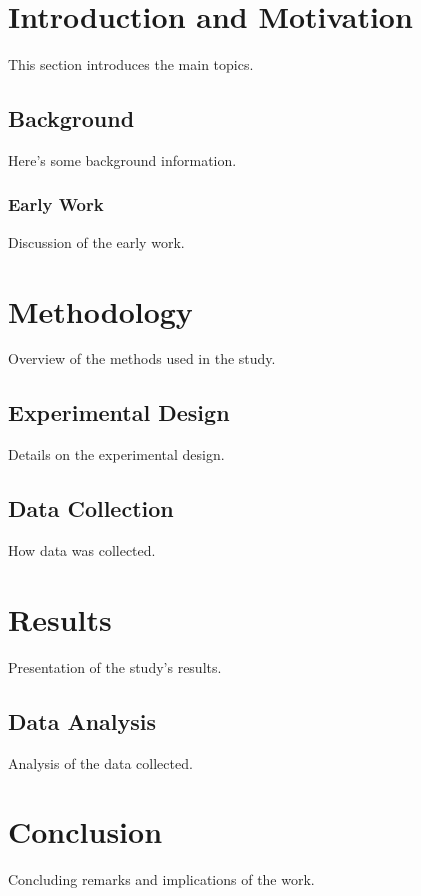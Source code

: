 \documentclass{article}
\begin{document}
\tableofcontents

\newpage

\section{Introduction and Motivation}
This section introduces the main topics.

\subsection{Background}
Here's some background information.

\subsubsection{Early Work}
Discussion of the early work.

\section{Methodology}
Overview of the methods used in the study.

\subsection{Experimental Design}
Details on the experimental design.

\subsection{Data Collection}
How data was collected.

\section{Results}
Presentation of the study's results.

\subsection{Data Analysis}
Analysis of the data collected.

\section{Conclusion}
Concluding remarks and implications of the work.
\end{document}
